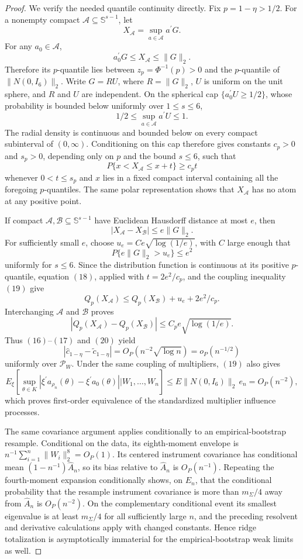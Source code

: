 \documentclass{article}
\begin{document}
\begin{proof}
We verify the needed quantile continuity directly. Fix \(p=1-\eta>1/2\). For a nonempty compact \(\mathcal A\subseteq\mathbb S^{s-1}\), let
\[
 X_{\mathcal A}=\sup_{a\in\mathcal A}a^{\prime}G.
\]
For any \(a_0\in\mathcal A\),
\[
 a_0^{\prime}G\leq X_{\mathcal A}\leq\|G\|_2.
\]
Therefore its \(p\)-quantile lies between \(z_p=\Phi^{-1}(p)>0\) and the \(p\)-quantile of \(\|N(0,I_6)\|_2\). Write \(G=RU\), where \(R=\|G\|_2\), \(U\) is uniform on the unit sphere, and \(R\) and \(U\) are independent. On the spherical cap \(\{a_0^{\prime}U\geq1/2\}\), whose probability is bounded below uniformly over \(1\leq s\leq6\),
\[
 1/2\leq\sup_{a\in\mathcal A}a^{\prime}U\leq1.
\]
The radial density is continuous and bounded below on every compact subinterval of \((0,\infty)\). Conditioning on this cap therefore gives constants \(c_p>0\) and \(s_p>0\), depending only on \(p\) and the bound \(s\leq6\), such that
\[
 P\{x<X_{\mathcal A}\leq x+t\}\geq c_pt \tag{18}
\]
whenever \(0<t\leq s_p\) and \(x\) lies in a fixed compact interval containing all the foregoing \(p\)-quantiles. The same polar representation shows that \(X_{\mathcal A}\) has no atom at any positive point.

If compact \(\mathcal A,\mathcal B\subseteq\mathbb S^{s-1}\) have Euclidean Hausdorff distance at most \(e\), then
\[
 |X_{\mathcal A}-X_{\mathcal B}|\leq e\|G\|_2. \tag{19}
\]
For sufficiently small \(e\), choose \(u_e=C e\sqrt{\log(1/e)}\), with \(C\) large enough that
\[
 P\{e\|G\|_2>u_e\}\leq e^2
\]
uniformly for \(s\leq6\). Since the distribution function is continuous at its positive \(p\)-quantile, equation \((18)\), applied with \(t=2e^2/c_p\), and the coupling inequality \((19)\) give
\[
 Q_p(X_{\mathcal A})\leq Q_p(X_{\mathcal B})+u_e+2e^2/c_p.
\]
Interchanging \(\mathcal A\) and \(\mathcal B\) proves
\[
 |Q_p(X_{\mathcal A})-Q_p(X_{\mathcal B})|
 \leq C_p e\sqrt{\log(1/e)}. \tag{20}
\]
Thus \((16)\)--\((17)\) and \((20)\) yield
\[
 |\widehat c_{1-\eta}-\widetilde c_{1-\eta}|
 =O_P(n^{-2}\sqrt{\log n})=o_P(n^{-1/2}) \tag{21}
\]
uniformly over \(\mathcal P_W\). Under the same coupling of multipliers, \((19)\) also gives
\[
 E_{\xi}\left[
 \sup_{\theta\in K}|\xi^{\prime}a_{\rho_n}(\theta)-\xi^{\prime}a_0(\theta)|
 \mathrel{\big|}W_1,\ldots,W_n\right]
 \leq E\|N(0,I_6)\|_2\,e_n=O_P(n^{-2}),
\]
which proves first-order equivalence of the standardized multiplier influence processes.

The same covariance argument applies conditionally to an empirical-bootstrap resample. Conditional on the data, its eighth-moment envelope is \(n^{-1}\sum_{i=1}^n\|W_i\|_2^8=O_P(1)\). Its centered instrument covariance has conditional mean \((1-n^{-1})\widehat A_n\), so its bias relative to \(\widehat A_n\) is \(O_P(n^{-1})\). Repeating the fourth-moment expansion conditionally shows, on \(E_n\), that the conditional probability that the resample instrument covariance is more than \(m_{\Sigma}/4\) away from \(\widehat A_n\) is \(O_P(n^{-2})\). On the complementary conditional event its smallest eigenvalue is at least \(m_{\Sigma}/4\) for all sufficiently large \(n\), and the preceding resolvent and derivative calculations apply with changed constants. Hence ridge totalization is asymptotically immaterial for the empirical-bootstrap weak limits as well.


\end{proof}
\end{document}
